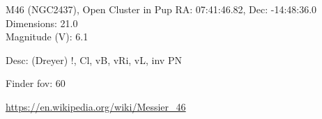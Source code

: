 \begin{block}{M46 (NGC2437), Open Cluster in Pup}
    RA: 07:41:46.82, Dec: -14:48:36.0 \\ 
    Dimensions: 21.0 \\ 
    Magnitude (V): 6.1


    Desc: (Dreyer) !, Cl, vB, vRi, vL, inv PN  

    Finder fov: 60 

    \url{https://en.wikipedia.org/wiki/Messier_46} 
\end{block}